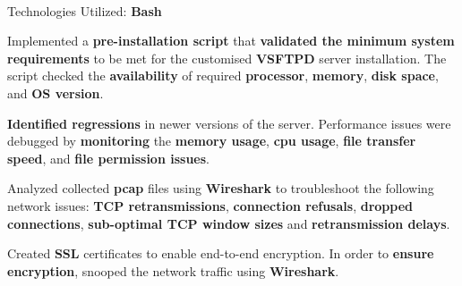 \documentclass[]{deedy-resume-openfont}
\begin{document}
\begin{minipage}[t]{0.66\textwidth}
\\
\begin{tightemize}
\item Technologies Utilized: \textbf{Bash}
\item Implemented a \textbf{pre-installation script} that \textbf{validated the minimum system requirements} to be met for the customised \textbf{VSFTPD} server installation. The script checked the \textbf{availability} of required \textbf{processor}, \textbf{memory}, \textbf{disk space}, and \textbf{OS version}.
\item \textbf{Identified regressions} in newer versions of the server. Performance issues were debugged by \textbf{monitoring} the \textbf{memory usage}, \textbf{cpu usage}, \textbf{file transfer speed}, and \textbf{file permission issues}.
\item Analyzed collected \textbf{pcap} files using \textbf{Wireshark} to troubleshoot the following network issues: \textbf{TCP retransmissions}, \textbf{connection refusals}, \textbf{dropped connections}, \textbf{sub-optimal TCP window sizes} and \textbf{retransmission delays}.
\item Created \textbf{SSL} certificates to enable end-to-end encryption. In order to \textbf{ensure encryption}, snooped the network traffic using \textbf{Wireshark}.
\end{tightemize}
\sectionsep





\end{minipage}
\end{document}
